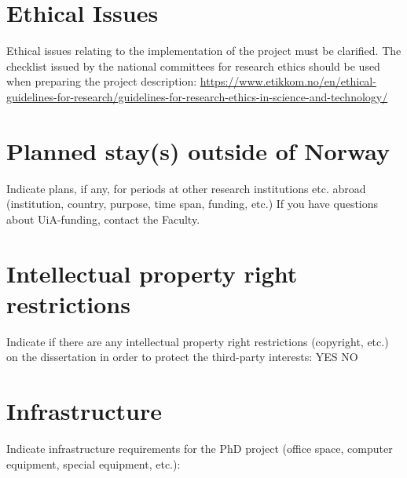 \documentclass{uiaphd}
\begin{document}
	
	
	\section*{Ethical Issues}
	Ethical issues relating to the implementation of the project must be clarified. The checklist issued by the national committees for research ethics should be used when preparing the project description: \url{https://www.etikkom.no/en/ethical-guidelines-for-research/guidelines-for-research-ethics-in-science-and-technology/}
	\\
	
	\setlength{\fboxsep}{6pt}\noindent{}

	\section*{Planned stay(s) outside of Norway}
	Indicate plans, if any, for periods at other research institutions etc. abroad (institution, country, purpose, time span, funding, etc.) If you have questions about UiA-funding, contact the Faculty.
	
	\section*{Intellectual property right restrictions}
	Indicate if there are any intellectual property right restrictions (copyright, etc.) on the dissertation in order to protect the third-party interests: {\quad \quad \checkbox YES} {\quad \quad \checkbox NO}
	
%	
	
	\section*{Infrastructure}
	
	Indicate infrastructure requirements for the PhD project (office space, computer equipment, special equipment, etc.):
	
	
	
	
\end{document}
